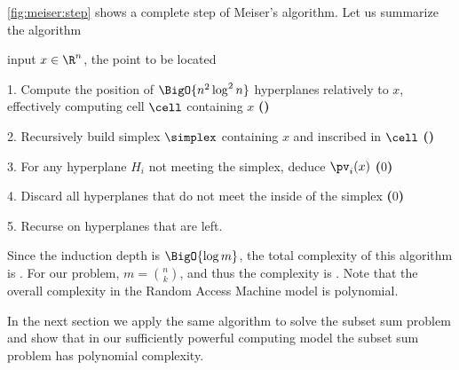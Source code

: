 \ref{fig:meiser:step} shows a complete step of Meiser's algorithm.
Let us summarize the algorithm
\begin{algorithm}
\item[input] $x \in \R^n$, the point to be located
\item[1.] Compute the position of $\BigO{n^2 \log^2 n}$ hyperplanes relatively to
$x$, effectively computing cell $\cell$ containing $x$ \textbf{()}
\item[2.] Recursively build simplex $\simplex$ containing $x$ and inscribed in $\cell$
\textbf{()}
\item[3.] For any hyperplane $H_i$ not meeting the simplex, deduce $\pv_i(x)$
\textbf{($0$)}
\item[4.] Discard all hyperplanes that do not meet the inside of the
simplex \textbf{($0$)}
\item[5.] Recurse on hyperplanes that are left.
\end{algorithm}

Since the induction depth is $\BigO{\log m}$, the total complexity of this algorithm
is . For our \kSUM problem, $m = \binom{n}{k}$,
and thus the complexity is . Note that the overall
complexity in the Random Access Machine model is polynomial.

In the next section we apply the same algorithm to solve the
subset sum problem and show that in our sufficiently powerful computing
model the subset sum problem has polynomial complexity.


